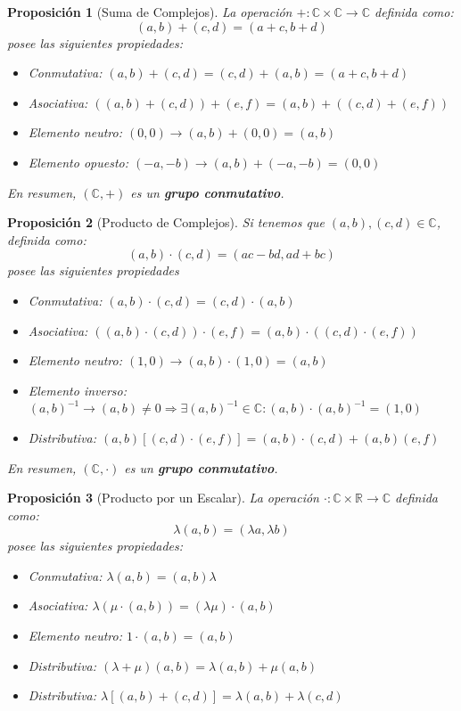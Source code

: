 \documentclass[10pt,a4paper,openright]{book}
\theoremstyle{break}
\newtheorem*{prop}{Proposición}
\begin{document}
\begin{prop}[Suma de Complejos]
La operación $+: \mathbb{C}\times \mathbb{C} \rightarrow \mathbb{C}$ definida como:
$$(a,b)+(c,d)=(a+c,b+d)$$
posee las siguientes propiedades:
\begin{itemize}
\item Conmutativa: $(a,b)+(c,d)=(c,d)+(a,b)=(a+c,b+d)$
\item Asociativa: $\left((a,b)+(c,d)\right)+(e,f)=(a,b)+\left((c,d)+(e,f)\right)$
\item Elemento neutro: $(0,0)\rightarrow (a,b)+(0,0)=(a,b)$
\item Elemento opuesto: $(-a,-b)\rightarrow (a,b)+(-a,-b)=(0,0)$
\end{itemize}
En resumen, $(\mathbb C, +)$ es un \textbf{grupo conmutativo}.
\end{prop}

\begin{prop}[Producto de Complejos]
Si tenemos que $(a,b),(c,d)\in \mathbb C$, definida como:
$$(a,b)\cdot (c,d)=(ac-bd,ad+bc)$$
posee las siguientes propiedades
\begin{itemize}
\item Conmutativa: $(a,b)\cdot (c,d)=(c,d)\cdot (a,b)$
\item Asociativa: $\left((a,b)\cdot(c,d)\right)\cdot (e,f)=(a,b)\cdot \left((c,d)\cdot (e,f)\right)$
\item Elemento neutro: $(1,0)\rightarrow (a,b)\cdot (1,0)=(a,b)$
\item Elemento inverso: $(a,b)^{-1}\rightarrow (a,b)\neq 0\Rightarrow \exists (a,b)^{-1}\in \mathbb C: (a,b)\cdot (a,b)^{-1}=(1,0)$
\item Distributiva: $(a,b)[(c,d)\cdot(e,f)]=(a,b)\cdot (c,d)+(a,b)(e,f)$
\end{itemize}
En resumen, $(\mathbb C, \cdot)$ es un \textbf{grupo conmutativo}.
\end{prop}

\begin{prop}[Producto por un Escalar]
La operación $\cdot : \mathbb{C}\times \mathbb{R}\rightarrow \mathbb{C}$ definida como:
$$\lambda(a,b)=(\lambda a,\lambda b)$$
posee las siguientes propiedades:
\begin{itemize}
\item Conmutativa: $\lambda(a,b)=(a,b)\lambda$
\item Asociativa: $\lambda(\mu \cdot (a,b))=(\lambda\mu)\cdot (a,b)$
\item Elemento neutro: $1\cdot (a,b)=(a,b)$
\item Distributiva: $(\lambda+\mu)(a,b)=\lambda (a,b)+\mu (a,b)$\par
\item Distributiva: $\lambda[(a,b)+(c,d)]=\lambda(a,b)+\lambda(c,d)$
\end{itemize}
\end{prop}
\end{document}
